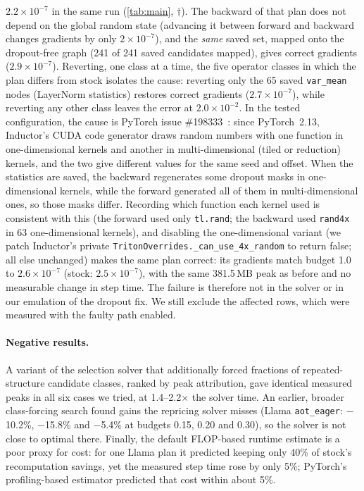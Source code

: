 \documentclass[10pt]{article}
\newcommand{\code}[1]{\texttt{#1}}
\begin{document}
\begin{itemize}
$2.2\times10^{-7}$ in the same run (\cref{tab:main}, $\dagger$). The backward of that plan does not depend on the global
random state (advancing it between forward and backward changes gradients by only $2\times10^{-7}$), and the \emph{same}
saved set, mapped onto the dropout-free graph (241 of 241 saved candidates mapped), gives correct gradients
($2.9\times10^{-7}$). Reverting, one class at a time, the five operator classes in which the plan differs from stock
isolates the cause: reverting only the 65 saved \code{var\_mean} nodes (LayerNorm statistics) restores correct gradients ($2.7\times10^{-7}$), while reverting any other
class leaves the error at $2.0\times10^{-2}$. In the tested configuration, the cause is PyTorch issue \#198333~\citep{issue198333}: since
PyTorch~2.13, Inductor's CUDA code generator draws random numbers with one function in one-dimensional kernels and
another in multi-dimensional (tiled or reduction) kernels, and the two give different values for the same seed and offset. When the
statistics are saved, the backward regenerates some dropout masks in one-dimensional kernels, while the forward
generated all of them in multi-dimensional ones, so those masks differ. Recording which function each kernel used is
consistent with this (the forward used only \code{tl.rand}; the backward used \code{rand4x} in 63 one-dimensional kernels),
and disabling the one-dimensional variant (we patch Inductor's private \code{TritonOverrides.\_can\_use\_4x\_random} to
return false; all else unchanged) makes the same plan correct: its gradients match budget
1.0 to $2.6\times10^{-7}$ (stock: $2.5\times10^{-7}$), with the same 381.5\,MB peak as before and no measurable change in
step time. The failure is therefore not in the solver or in our emulation of the dropout fix. We still exclude the
affected rows, which were measured with the faulty path enabled.
\end{itemize}

\paragraph{Negative results.} A variant of the selection solver that additionally forced fractions of
repeated-structure candidate classes, ranked by peak attribution, gave identical measured peaks in all six cases we
tried, at 1.4--2.2$\times$ the solver time. An earlier, broader class-forcing search found gains the repricing solver
misses (Llama \code{aot\_eager}: $-$10.2\%, $-$15.8\% and $-$5.4\% at budgets 0.15, 0.20 and 0.30), so the solver is not
close to optimal there. Finally, the default FLOP-based runtime estimate is a poor proxy for cost: for one Llama plan it
predicted keeping only 40\% of stock's recomputation savings, yet the measured step time rose by only 5\%; PyTorch's
profiling-based estimator predicted that cost within about 5\%.
\end{document}
